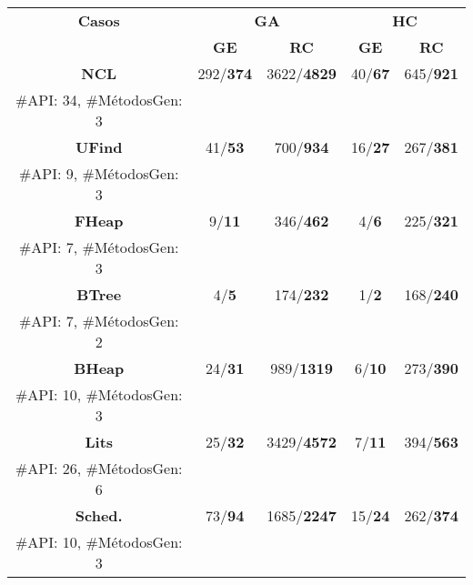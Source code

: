 \setlength{\tabcolsep}{4pt} 

\begin{table}[H]
\centering
\scriptsize
\begin{tabular}{cccccc}
\hline
\multicolumn{2}{c}{\textbf{Casos}} & \multicolumn{2}{c}{\textbf{GA}} & \multicolumn{2}{c}{\textbf{HC}} \\
\cline{3-6}
\multicolumn{2}{c}{} & \textbf{\tiny GE} & \textbf{\tiny RC} & \textbf{\tiny GE} & \textbf{\tiny RC} \\
\hline
\multicolumn{2}{c}{\textbf{NCL}}            & 292/\textbf{374}   & 3622/\textbf{4829} & 40/\textbf{67}   & 645/\textbf{921}  \\
\multicolumn{2}{c}{\tiny \#API: 34, \#MétodosGen: 3} & & & & \\

\multicolumn{2}{c}{\textbf{UFind}}          & 41/\textbf{53}     & 700/\textbf{934}   & 16/\textbf{27}   & 267/\textbf{381}  \\
\multicolumn{2}{c}{\tiny \#API: 9, \#MétodosGen: 3}  & & & & \\

\multicolumn{2}{c}{\textbf{FHeap}}          & 9/\textbf{11}      & 346/\textbf{462}   & 4/\textbf{6}     & 225/\textbf{321}  \\
\multicolumn{2}{c}{\tiny \#API: 7, \#MétodosGen: 3}  & & & & \\

\multicolumn{2}{c}{\textbf{BTree}}          & 4/\textbf{5}       & 174/\textbf{232}   & 1/\textbf{2}     & 168/\textbf{240}  \\
\multicolumn{2}{c}{\tiny \#API: 7, \#MétodosGen: 2}  & & & & \\

\multicolumn{2}{c}{\textbf{BHeap}}          & 24/\textbf{31}     & 989/\textbf{1319}  & 6/\textbf{10}    & 273/\textbf{390}  \\
\multicolumn{2}{c}{\tiny \#API: 10, \#MétodosGen: 3} & & & & \\

\multicolumn{2}{c}{\textbf{Lits}}           & 25/\textbf{32}     & 3429/\textbf{4572} & 7/\textbf{11}    & 394/\textbf{563}  \\
\multicolumn{2}{c}{\tiny \#API: 26, \#MétodosGen: 6} & & & & \\

\multicolumn{2}{c}{\textbf{Sched.}}         & 73/\textbf{94}     & 1685/\textbf{2247} & 15/\textbf{24}   & 262/\textbf{374}  \\
\multicolumn{2}{c}{\tiny \#API: 10, \#MétodosGen: 3} & & & & \\


\end{tabular}
\end{table}
